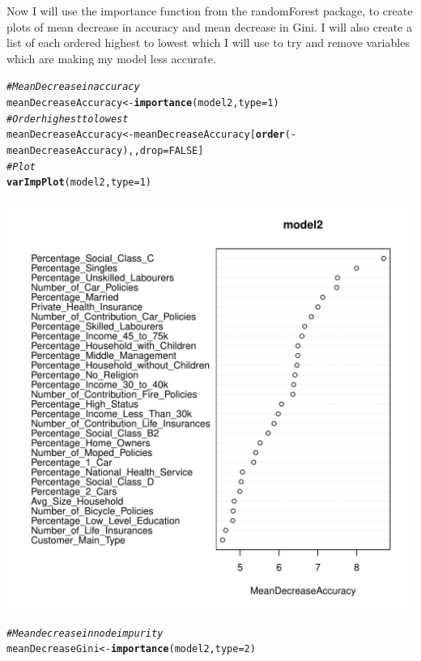 \documentclass{article}\usepackage[]{graphicx}\usepackage[]{color}
\makeatletter
\def\maxwidth{ %
  \ifdim\Gin@nat@width>\linewidth
    \linewidth
  \else
    \Gin@nat@width
  \fi
}
\newcommand{\hlnum}[1]{\textcolor[rgb]{0.686,0.059,0.569}{#1}}%
\newcommand{\hlcom}[1]{\textcolor[rgb]{0.678,0.584,0.686}{\textit{#1}}}%
\newcommand{\hlopt}[1]{\textcolor[rgb]{0,0,0}{#1}}%
\newcommand{\hlstd}[1]{\textcolor[rgb]{0.345,0.345,0.345}{#1}}%
\newcommand{\hlkwb}[1]{\textcolor[rgb]{0.69,0.353,0.396}{#1}}%
\newcommand{\hlkwc}[1]{\textcolor[rgb]{0.333,0.667,0.333}{#1}}%
\newcommand{\hlkwd}[1]{\textcolor[rgb]{0.737,0.353,0.396}{\textbf{#1}}}%
\newenvironment{kframe}{%
 \def\at@end@of@kframe{}%
 \ifinner\ifhmode%
  \def\at@end@of@kframe{\end{minipage}}%
  \begin{minipage}{\columnwidth}%
 \fi\fi%
 \def\FrameCommand##1{\hskip\@totalleftmargin \hskip-\fboxsep
 \colorbox{shadecolor}{##1}\hskip-\fboxsep
     \hskip-\linewidth \hskip-\@totalleftmargin \hskip\columnwidth}%
 \MakeFramed {\advance\hsize-\width
   \@totalleftmargin\z@ \linewidth\hsize
   \@setminipage}}%
 {\par\unskip\endMakeFramed%
 \at@end@of@kframe}
\newenvironment{knitrout}{}{} %
\makeatother
\begin{document}
Now I will use the importance function from the randomForest package, to create plots of mean decrease in accuracy and mean decrease in Gini. I will also create a list of each ordered highest to lowest which I will use to try and remove variables which are making my model less accurate. 
\begin{knitrout}
\color{fgcolor}\begin{kframe}
\begin{alltt}
\hlcom{#Mean Decrease in accuracy}
\hlstd{meanDecreaseAccuracy}\hlkwb{<-}\hlkwd{importance}\hlstd{(model2,}\hlkwc{type}\hlstd{=}\hlnum{1}\hlstd{)}
\hlcom{#Order highest to lowest}
\hlstd{meanDecreaseAccuracy}\hlkwb{<-}\hlstd{meanDecreaseAccuracy[}\hlkwd{order}\hlstd{(}\hlopt{-}\hlstd{meanDecreaseAccuracy),,}\hlkwc{drop}\hlstd{=}\hlnum{FALSE}\hlstd{]}
\hlcom{#Plot}
\hlkwd{varImpPlot}\hlstd{(model2,}\hlkwc{type}\hlstd{=}\hlnum{1}\hlstd{)}
\end{alltt}
\end{kframe}
\includegraphics[width=\maxwidth]{figure/unnamed-chunk-40-1} 
\begin{kframe}\begin{alltt}
\hlcom{#Mean decrease in node impurity}
\hlstd{meanDecreaseGini}\hlkwb{<-}\hlkwd{importance}\hlstd{(model2,}\hlkwc{type}\hlstd{=}\hlnum{2}\hlstd{)}

\end{alltt}
\end{kframe}
\end{knitrout}
\end{document}
